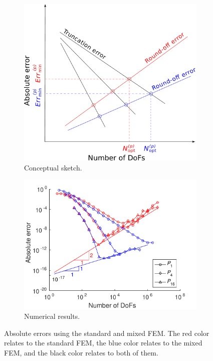 \documentclass[a4paper]{article}
\begin{document}
\begin{figure}[ht]
\hspace{0.2cm}
\begin{subfigure}{7.5cm}
    \includegraphics[width=0.9\linewidth,natwidth=500,natheight=480]{rounding_error_p_dependent_SM_MM.pdf}
    \caption{Conceptual sketch.}
    \label{Fig:rounding_error_p_dependent_SM_MM}
\end{subfigure}
\hspace{0.0cm}
\begin{subfigure}{7.5cm}
    \includegraphics[width=1.2\linewidth,natwidth=500,natheight=365]{Helm_xi_S_M2_abs_solu.pdf}
    \vspace*{-5.5mm}
    \caption{Numerical results.}   
    \label{Fig:Helm_xi_S_M2_abs_solu}
\end{subfigure}
\caption{Absolute errors using the standard and mixed FEM. The red color relates to the standard FEM, the blue color relates to the mixed FEM, and the black color relates to both of them.}
\label{Fig:rounding_error_left_theoritical_right_practical}
\end{figure}
\end{document}
